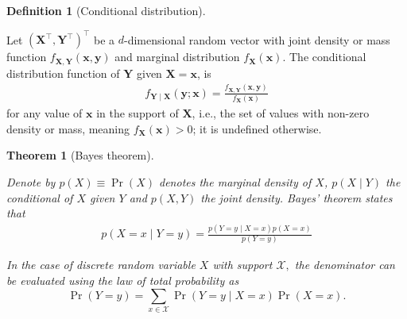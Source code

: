\documentclass[
  11pt,
  letterpaper,
]{scrbook}
\theoremstyle{definition}
\theoremstyle{definition}
\theoremstyle{definition}
\newtheorem{definition}{Definition}[chapter]
\theoremstyle{plain}
\theoremstyle{plain}
\newtheorem{theorem}{Theorem}[chapter]
\theoremstyle{remark}
\begin{document}
\begin{definition}[Conditional
distribution]\protect\hypertarget{def-conditional-dist}{}\label{def-conditional-dist}

Let \((\boldsymbol{X}^\top, \boldsymbol{Y}^\top)^\top\) be a
\(d\)-dimensional random vector with joint density or mass function
\(f_{\boldsymbol{X}, \boldsymbol{Y}}(\boldsymbol{x}, \boldsymbol{y})\)
and marginal distribution \(f_{\boldsymbol{X}}(\boldsymbol{x})\). The
conditional distribution function of \(\boldsymbol{Y}\) given
\(\boldsymbol{X}=\boldsymbol{x}\), is \begin{align*}
f_{\boldsymbol{Y} \mid \boldsymbol{X}}(\boldsymbol{y}; \boldsymbol{x}) = \frac{f_{\boldsymbol{X}, \boldsymbol{Y}}(\boldsymbol{x}, \boldsymbol{y})}{f_{\boldsymbol{X}}(\boldsymbol{x})}
\end{align*} for any value of \(\boldsymbol{x}\) in the support of
\(\boldsymbol{X}\), i.e., the set of values with non-zero density or
mass, meaning \(f_{\boldsymbol{X}}(\boldsymbol{x})>0\); it is undefined
otherwise.

\end{definition}

\begin{theorem}[Bayes
theorem]\protect\hypertarget{thm-Bayes}{}\label{thm-Bayes}

Denote by \(p(X) \equiv\Pr(X)\) denotes the marginal density of \(X\),
\(p(X \mid Y)\) the conditional of \(X\) given \(Y\) and \(p(X, Y)\) the
joint density. Bayes' theorem states that \begin{align*}
p(X = x \mid Y=y) = \frac{p(Y = y \mid X = x)p(X=x)}{p(Y=y)}
\end{align*}

In the case of discrete random variable \(X\) with support
\(\mathcal{X},\) the denominator can be evaluated using the law of total
probability as
\[\Pr(Y=y) = \sum_{x \in \mathcal{X}}\Pr(Y =y \mid X=x)\Pr(X=x).\]

\end{theorem}
\end{document}
